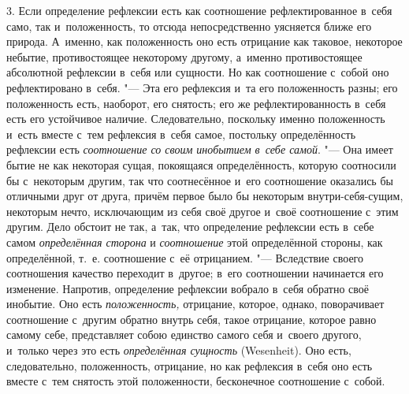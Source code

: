 3. Если определение рефлексии есть как соотношение рефлектированное в~себя
само, так и~положенность, то отсюда непосредственно уясняется ближе его
природа. А~именно, как положенность оно есть отрицание как таковое,
некоторое небытие, противостоящее некоторому другому, а~именно
противостоящее абсолютной рефлексии в~себя или сущности. Но как соотношение
с~собой оно рефлектировано в~себя. "--- Эта его рефлексия и~та его положенность
разны; его положенность есть, наоборот, его снятость; его же
рефлектированность в~себя есть его устойчивое наличие. Следовательно,
поскольку именно положенность и~есть вместе с~тем рефлексия в~себя самое,
постольку определённость рефлексии есть
{\em соотношение со своим инобытием в~себе самой}. "---
Она имеет бытие не как некоторая сущая, покоящаяся определённость, которую
соотносили бы с~некоторым другим, так что соотнесённое и~его соотношение
оказались бы отличными друг от друга, причём первое было бы некоторым
внутри-себя-сущим, некоторым нечто, исключающим из себя своё другое и~своё
соотношение с~этим другим. Дело обстоит не так, а~так, что определение
рефлексии есть в~себе самом {\em определённая сторона}
и {\em соотношение} этой определённой стороны, как
определённой, т.~е. соотношение с~её отрицанием. "--- Вследствие своего
соотношения качество переходит в~другое; в~его соотношении начинается его
изменение. Напротив, определение рефлексии вобрало в~себя обратно своё
инобытие. Оно есть {\em положенность,} отрицание,
которое, однако, поворачивает соотношение с~другим обратно внутрь себя,
такое отрицание, которое равно самому себе, представляет собою единство
самого себя и~своего другого, и~только через это есть
{\em определённая сущность} (Wesenheit). Оно есть,
следовательно, положенность, отрицание, но как рефлексия в~себя оно есть
вместе с~тем снятость этой положенности, бесконечное соотношение с~собой.

